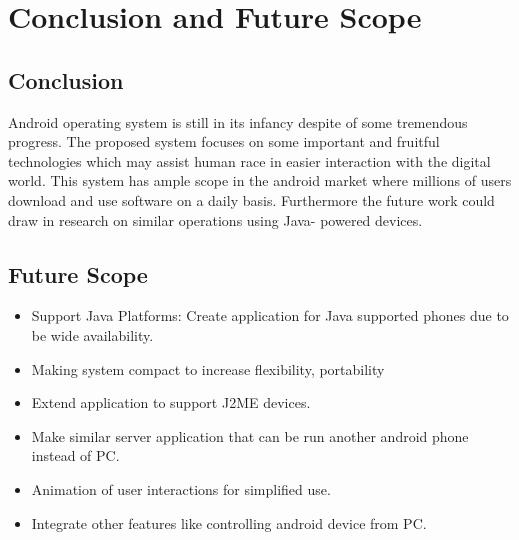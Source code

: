 \chapter{Conclusion and Future Scope}
\section{Conclusion}
\hspace*{0.82cm}Android operating system is still in its infancy despite of some tremendous progress.
The proposed system focuses on some important and fruitful technologies which may assist
human race in easier interaction with the digital world. This system has ample scope in the
android market where millions of users download and use software on a daily basis.
Furthermore the future work could draw in research on similar operations using Java-
powered devices.
\section{Future Scope}
\begin{itemize}
 \item Support Java Platforms: Create application for Java supported phones due to be wide
availability.
 \item Making system compact to increase flexibility, portability
 \item Extend application to support J2ME devices.
 \item Make similar server application that can be run another android phone instead of PC.
 \item Animation of user interactions for simplified use.
 \item Integrate other features like controlling android device from PC.
\end{itemize}
